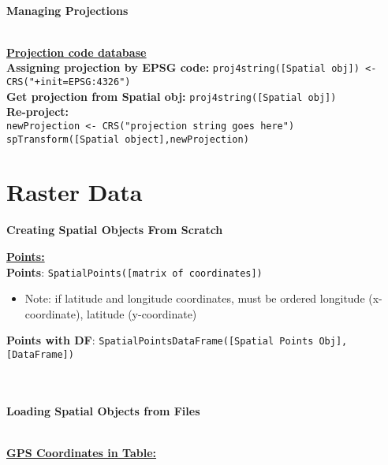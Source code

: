 \documentclass[10pt]{article}
\begin{document}

\hrulefill \\ 
\centerline{\textbf{Managing Projections}} \\
\href{http://www.spatialreference.org/}{\underline{\textbf{Projection code database}}} \\
\hspace{0.3cm}
\textbf{Assigning projection by EPSG code:} \texttt{proj4string([Spatial obj]) <-CRS("+init=EPSG:4326")}\\
\textbf{Get projection from Spatial obj:} \texttt{proj4string([Spatial obj])} \\
\textbf{Re-project:} \\
\hspace*{0.3cm}\texttt{newProjection <- CRS("projection string goes here")}\\
\hspace*{0.3cm}\texttt{spTransform([Spatial object],newProjection)}\\


\section*{Raster Data}



\centerline{\textbf{Creating Spatial Objects From Scratch}} 
\underline{\textbf{Points:}}\\

\textbf{Points}: \texttt{SpatialPoints([matrix of coordinates])}
\begin{itemize}
	\item Note: if latitude and longitude coordinates, must be ordered longitude (x-coordinate), latitude (y-coordinate)
\end{itemize}
\textbf{Points with DF}: \texttt{SpatialPointsDataFrame([Spatial Points Obj], [DataFrame])}\\
\\




\hrulefill \\ 
\centerline{\textbf{Loading Spatial Objects from Files}} \\
\underline{\textbf{GPS Coordinates in Table:}}\\


\end{document}
